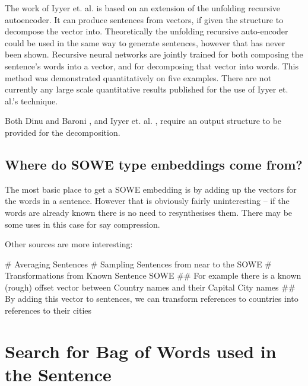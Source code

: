 \documentclass[]{scrartcl}
\begin{document}
The work of Iyyer et. al. \cite{iyyer2014generating} is based on an extension of the unfolding recursive autoencoder\cite{SocherEtAl2011:PoolRAE}. It can produce sentences from vectors, if given the structure to decompose the vector into. Theoretically the unfolding recursive auto-encoder could be used in the same way to generate sentences, however that has never been shown. Recursive neural networks are jointly trained for both composing the sentence's words into a vector, and for decomposing that vector into words. This method was demonstrated quantitatively on five examples. There are not currently any large scale quantitative results published for the use of Iyyer et. al.'s technique.

Both Dinu and Baroni \cite{Dinu2014CompositionalGeneration}, and Iyyer et. al. \cite{iyyer2014generating}, require an output structure to be provided for the decomposition.


\subsection{Where do SOWE type embeddings come from?}
The most basic place to get a SOWE embedding is by adding up the vectors for the words in a sentence.
However that is obviously fairly uninteresting -- if the words are already known there is no need to resynthesises them. There may be some uses in this case for say compression.

Other sources are more interesting:

\begin{easylist}[itemize]
	# Averaging Sentences
	# Sampling Sentences from near to the SOWE
	# Transformations from Known Sentence SOWE
	## For example there is a known (rough) offset vector between Country names and their Capital City names
	## By adding this vector to sentences, we can transform references to countries into references to their cities
\end{easylist}


\section{Search for Bag of Words used in the Sentence}


\end{document}
